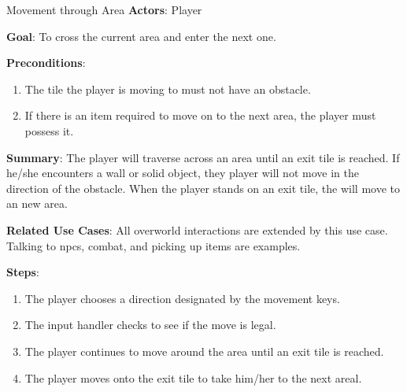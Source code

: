 \begin{subsection}{Movement through Area}
\textbf{Actors}:
Player

\textbf{Goal}:
To cross the current area and enter the next one.

\textbf{Preconditions}:
\begin{enumerate}
\item The tile the player is moving to must not have an obstacle. 
\item If there is an item required to move on to the next area, the player must possess it.
\end{enumerate}

\textbf{Summary}:
The player will traverse across an area until an exit tile is reached. If he/she encounters a wall or solid object, they player will not move in the direction of the obstacle. When the player stands on an exit tile, the will move to an new area.

\textbf{Related Use Cases}:
All overworld interactions are extended by this use case. Talking to npcs, combat, and picking up items are examples.

\textbf{Steps}:
\begin{enumerate}
\item The player chooses a direction designated by the movement keys.
\item The input handler checks to see if the move is legal.
\item The player continues to move around the area until an exit tile is reached.
\item The player moves onto the exit tile to take him/her to the next areal.
\end{enumerate}
\end{subsection}



